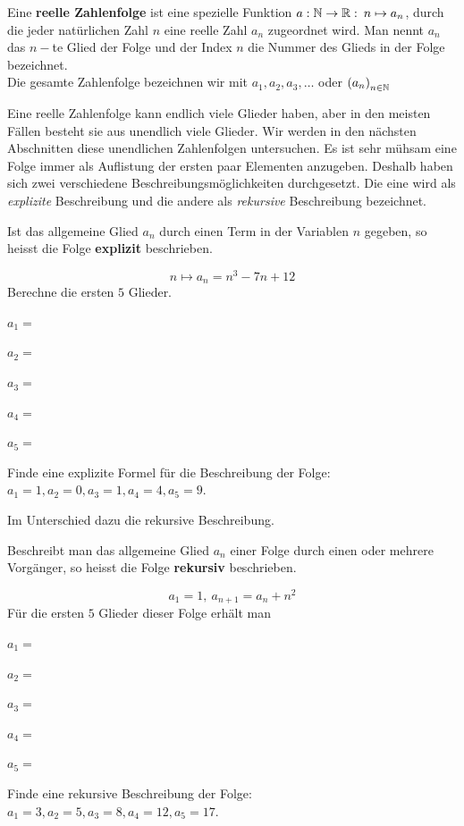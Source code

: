 \documentclass[11pt,oneside]{article}
\begin{document}
	\begin{definition}
		Eine \textbf{reelle Zahlenfolge} ist eine spezielle Funktion $a:\mathbb{N}\rightarrow\mathbb{R}:\:n\mapsto a_n$, durch die jeder natürlichen Zahl $n$ eine reelle Zahl $a_n$ zugeordnet wird. Man nennt $a_n$ das $n-$te Glied der Folge und der Index $n$ die Nummer des Glieds in der Folge bezeichnet.\\
		Die gesamte Zahlenfolge bezeichnen wir mit $a_1,a_2,a_3,\ldots$ oder $\left(a_n\right)_{n\in\mathbb{N}}$
	\end{definition}
	Eine reelle Zahlenfolge kann endlich viele Glieder haben, aber in den meisten Fällen besteht sie aus unendlich viele Glieder. Wir werden in den nächsten Abschnitten diese unendlichen Zahlenfolgen untersuchen. Es ist sehr mühsam eine Folge immer als Auflistung der ersten paar Elementen anzugeben. Deshalb haben sich zwei verschiedene Beschreibungsmöglichkeiten durchgesetzt. Die eine wird als \textit{explizite} Beschreibung und die andere als \textit{rekursive} Beschreibung bezeichnet.
	\begin{notation}
		Ist das allgemeine Glied $a_n$ durch einen Term in der Variablen $n$ gegeben, so heisst die Folge \textbf{explizit} beschrieben.
	\end{notation}
	\begin{beispiel}
		\[n\mapsto a_n=n^3-7n+12\]
		Berechne die ersten $5$ Glieder.
		\begin{enumcols}[5]
			\item $a_1=$ \item $a_2=$ \item $a_3=$ \item $a_4=$ \item $a_5=$
		\end{enumcols}
		Finde eine explizite Formel für die Beschreibung der Folge: $a_1=1, a_2=0, a_3=1, a_4=4, a_5=9$.\\[5pt]
	\end{beispiel}\newpage
	Im Unterschied dazu die rekursive Beschreibung.
	\begin{notation}
		Beschreibt man das allgemeine Glied $a_n$ einer Folge durch einen oder mehrere Vorgänger, so heisst die Folge \textbf{rekursiv} beschrieben.
	\end{notation}
	\begin{beispiel}
		\[a_1=1,\:a_{n+1}=a_n+n^2\]
		Für die ersten $5$ Glieder dieser Folge erhält man
		\begin{enumcols}[5]
			\item $a_1=$ \item $a_2=$ \item $a_3=$ \item $a_4=$ \item $a_5=$
		\end{enumcols}
		Finde eine rekursive Beschreibung der Folge: $a_1=3,a_2=5, a_3=8, a_4=12, a_5=17$.\\[5pt]
	\end{beispiel}
\end{document}

